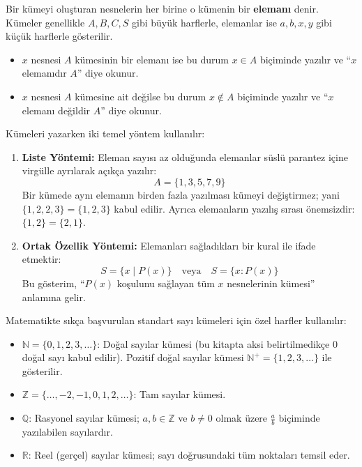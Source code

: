 \begin{definition}
Bir kümeyi oluşturan nesnelerin her birine o kümenin bir \textbf{elemanı} denir. Kümeler genellikle $A, B, C, S$ gibi büyük harflerle, elemanlar ise $a, b, x, y$ gibi küçük harflerle gösterilir.
\begin{itemize}
  \item $x$ nesnesi $A$ kümesinin bir elemanı ise bu durum $x \in A$ biçiminde yazılır ve ``$x$ elemanıdır $A$'' diye okunur.
  \item $x$ nesnesi $A$ kümesine ait değilse bu durum $x \notin A$ biçiminde yazılır ve ``$x$ elemanı değildir $A$'' diye okunur.
\end{itemize}
\end{definition}

Kümeleri yazarken iki temel yöntem kullanılır:
\begin{enumerate}
  \item \textbf{Liste Yöntemi:} Eleman sayısı az olduğunda elemanlar süslü parantez içine virgülle ayrılarak açıkça yazılır:
  \[ A = \{1, 3, 5, 7, 9\} \]
  Bir kümede aynı elemanın birden fazla yazılması kümeyi değiştirmez; yani $\{1, 2, 2, 3\} = \{1, 2, 3\}$ kabul edilir. Ayrıca elemanların yazılış sırası önemsizdir: $\{1, 2\} = \{2, 1\}$.
  
  \item \textbf{Ortak Özellik Yöntemi:} Elemanları sağladıkları bir kural ile ifade etmektir:
  \[ S = \{x \mid P(x)\} \quad \text{veya} \quad S = \{x : P(x)\} \]
  Bu gösterim, ``$P(x)$ koşulunu sağlayan tüm $x$ nesnelerinin kümesi'' anlamına gelir.
\end{enumerate}

Matematikte sıkça başvurulan standart sayı kümeleri için özel harfler kullanılır:
\begin{itemize}
  \item $\mathbb{N} = \{0, 1, 2, 3, \dots\}$: Doğal sayılar kümesi (bu kitapta aksi belirtilmedikçe $0$ doğal sayı kabul edilir). Pozitif doğal sayılar kümesi $\mathbb{N}^+ = \{1, 2, 3, \dots\}$ ile gösterilir.
  \item $\mathbb{Z} = \{\dots, -2, -1, 0, 1, 2, \dots\}$: Tam sayılar kümesi.
  \item $\mathbb{Q}$: Rasyonel sayılar kümesi; $a, b \in \mathbb{Z}$ ve $b \neq 0$ olmak üzere $\frac{a}{b}$ biçiminde yazılabilen sayılardır.
  \item $\mathbb{R}$: Reel (gerçel) sayılar kümesi; sayı doğrusundaki tüm noktaları temsil eder.
\end{itemize}

